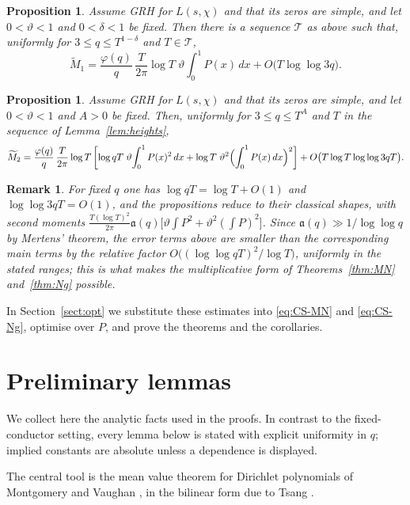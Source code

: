 \documentclass[10pt,a4paper]{amsart}
\newtheorem{proposition}[theorem]{Proposition}
\newtheorem*{remark}{Remark}
\numberwithin{equation}{section}
\begin{document}
\begin{proposition}\label{prop:M1Ng}
Assume GRH for $L(s,\chi)$ and that its zeros are simple, and let $0<\vartheta<1$ and $0<\delta<1$ be fixed. Then there is a sequence $\mathcal T$ as above such that, uniformly for $3\le q\le T^{1-\delta}$ and $T\in\mathcal T$,
\[
\widetilde M_1=\frac{\varphi(q)}{q}\,\frac{T}{2\pi}\log T\;\vartheta\!\int_0^1 P(x)\,dx+O\bigl(T\log\log 3q\bigr).
\]
\end{proposition}

\begin{proposition}\label{prop:M2Ng}
Assume GRH for $L(s,\chi)$ and that its zeros are simple, and let $0<\vartheta<1$ and $A>0$ be fixed. Then, uniformly for $3\le q\le T^{A}$ and $T$ in the sequence of Lemma~\ref{lem:heights},
\[
\widetilde M_2=\frac{\varphi(q)}{q}\,\frac{T}{2\pi}\log T\left[\log qT\;\vartheta\!\int_0^1 P(x)^2\,dx+\log T\;\vartheta^2\Bigl(\int_0^1 P(x)\,dx\Bigr)^2\right]+O\bigl(T\log T\log\log 3qT\bigr).
\]
\end{proposition}

\begin{remark}
For fixed $q$ one has $\log qT=\log T+O(1)$ and $\log\log 3qT=O(1)$, and the propositions reduce to their classical shapes, with second moments $\tfrac{T(\log T)^2}{2\pi}\mathfrak a(q)\bigl[\vartheta\int P^2+\vartheta^2(\int P)^2\bigr]$. Since $\mathfrak a(q)\gg1/\log\log q$ by Mertens' theorem, the error terms above are smaller than the corresponding main terms by the relative factor $O\bigl((\log\log qT)^2/\log T\bigr)$, uniformly in the stated ranges; this is what makes the multiplicative form of Theorems~\ref{thm:MN} and~\ref{thm:Ng} possible.
\end{remark}

In Section~\ref{sect:opt} we substitute these estimates into \eqref{eq:CS-MN} and \eqref{eq:CS-Ng}, optimise over $P$, and prove the theorems and the corollaries.

\section{Preliminary lemmas}\label{sect:lemmas}

We collect here the analytic facts used in the proofs. In contrast to the fixed-conductor setting, every lemma below is stated with explicit uniformity in $q$; implied constants are absolute unless a dependence is displayed.

The central tool is the mean value theorem for Dirichlet polynomials of Montgomery and Vaughan \cite{MV}, in the bilinear form due to Tsang \cite{Tsang}.
\end{document}
